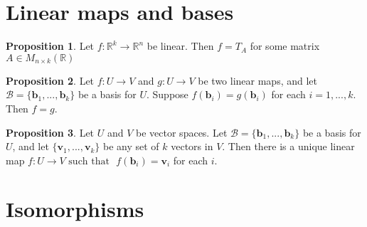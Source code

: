 \documentclass[11pt,a4paper]{article}
\newcommand\R{\mathbb{R}}
\newcommand\Bf{\mathcal{B}}
\newcommand\bb{\mathbf{b}}
\newcommand\vb{\mathbf{v}}
\newcommand\st{\text{ such that }}
\theoremstyle{definition}
\newtheorem{proposition}{Proposition}
\begin{document}
\section{Linear maps and bases}

\begin{proposition}
    Let $ f : \R^k \to \R^n $ be linear. Then $ f = T_A $ for some matrix $ A \in M_{n \times k} (\R) $
\end{proposition}

\begin{proposition}
    Let $ f : U \to V $ and $ g : U \to V $  be two linear maps, and let $ \Bf = \{ \bb_1, ..., \bb_k \} $ be a basis for $ U $. Suppose $ f(\bb_i) = g(\bb_i) $
    for each $ i = 1, ..., k. $ Then $ f = g $.
\end{proposition}

\begin{proposition}
    Let $ U $ and $ V $ be vector spaces. Let $ \Bf = \{ \bb_1, ..., \bb_k \} $ be a basis for $ U $, and let $ \{\vb_1, ..., \vb_k \} $ be any set of $ k $ vectors in $ V $.
    Then there is a unique linear map $ f : U \to V \st $ $ f (\bb_i) = \vb_i $ for each $ i $.
\end{proposition}

\section{Isomorphisms}
\end{document}
